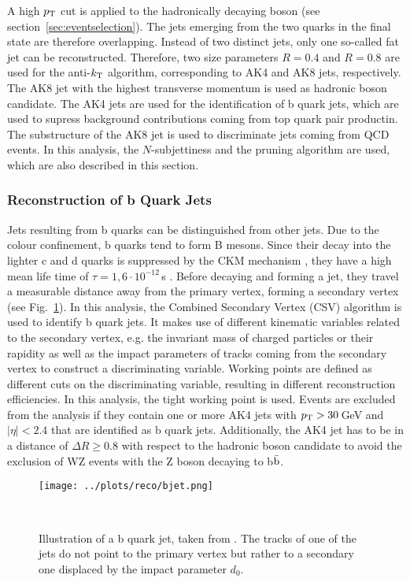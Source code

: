 \noindent A high $p_{\rm T}$ cut is applied to the hadronically decaying boson (see section~\ref{sec:eventselection}). The jets emerging from the two quarks in the final state are therefore overlapping. Instead of two distinct jets, only one so-called fat jet can be reconstructed. Therefore, two size parameters $R=0.4$ and $R=0.8$ are used for the anti-$k_{\rm T}$ algorithm, corresponding to AK4 and AK8 jets, respectively. The AK8 jet with the highest transverse momentum is used as hadronic boson candidate. The AK4 jets are used for the identification of b quark jets, which are used to supress background contributions coming from top quark pair productin. The substructure of the AK8 jet is used to discriminate jets coming from QCD events. In this analysis, the $N$-subjettiness and the pruning algorithm are used, which are also described in this section.

\subsubsection*{Reconstruction of b Quark Jets}
Jets resulting from b quarks can be distinguished from other jets. Due to the colour confinement, b quarks tend to form B mesons. Since their decay into the lighter c and d quarks is suppressed by the CKM mechanism \cite{CKM}, they have a high mean life time of $\tau=1,6\cdot 10^{-12}$\,s \cite{SMmasses}. Before decaying and forming a jet, they travel a measurable distance away from the primary vertex, forming a secondary vertex (see Fig.~\ref{fig:reco:bjet}). In this analysis, the Combined Secondary Vertex (CSV) algorithm \cite{CSV1,CSV2} is used to identify b quark jets. It makes use of different kinematic variables related to the secondary vertex, e.g. the invariant mass of charged particles or their rapidity as well as the impact parameters of tracks coming from the secondary vertex to construct a discriminating variable. Working points are defined as different cuts on the discriminating variable, resulting in different reconstruction efficiencies. In this analysis, the tight working point is used. Events are excluded from the analysis if they contain one or more AK4 jets with $p_{\rm T}>30$\,GeV and $|\eta|<2.4$ that are identified as b quark jets. Additionally, the AK4 jet has to be in a distance of $\Delta R \geq 0.8$ with respect to the hadronic boson candidate to avoid the exclusion of WZ events with the Z boson decaying to b$\bar{\rm b}$.
\begin{figure}
    \centering
    \texttt{[image: ../plots/reco/bjet.png]}
    \caption[Illustration of a b quark jet]{Illustration of a b quark jet, taken from \cite{bjet}. The tracks of one of the jets do not point to the primary vertex but rather to a secondary one displaced by the impact parameter $d_0$.}\
    \label{fig:reco:bjet}
\end{figure}

